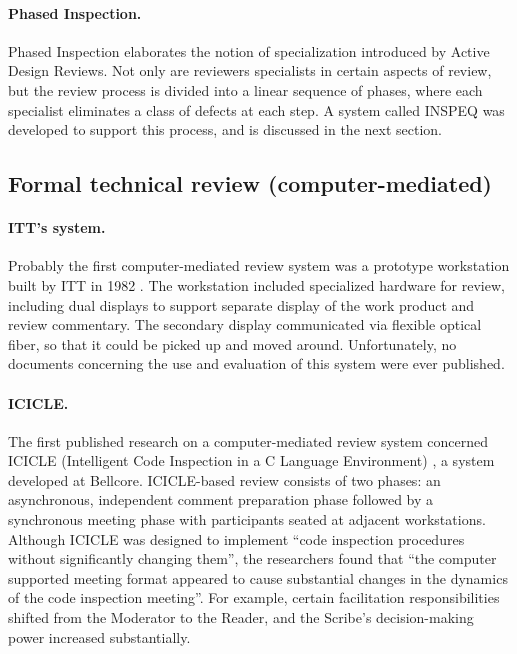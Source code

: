 \paragraph{Phased Inspection.}

Phased Inspection \cite{Knight93} elaborates the notion of specialization
introduced by Active Design Reviews.  Not only are reviewers specialists in
certain aspects of review, but the review process is divided into a linear
sequence of phases, where each specialist eliminates a class of defects at
each step.  A system called INSPEQ was developed to support this process,
and is discussed in the next section.


\subsection*{Formal technical review (computer-mediated)}


\paragraph{ITT's system.}
Probably the first computer-mediated review system was a prototype
workstation built by ITT in 1982 \cite{Jones95}. The workstation included
specialized hardware for review, including dual displays to support
separate display of the work product and review commentary.  The secondary
display communicated via flexible optical fiber, so that it could be picked
up and moved around.  Unfortunately, no documents concerning the use and
evaluation of this system were ever published.

\paragraph{ICICLE.}
The first published research on a computer-mediated review system
concerned ICICLE (Intelligent Code Inspection in a C Language Environment)
\cite{Brothers90}, a system developed at Bellcore.
ICICLE-based review consists of two phases: an asynchronous, independent
comment preparation phase followed by a synchronous meeting phase with
participants seated at adjacent workstations.  Although ICICLE was designed
to implement ``code inspection procedures without significantly changing
them'', the researchers found that ``the computer supported meeting format
appeared to cause substantial changes in the dynamics of the code
inspection meeting''.  For example, certain facilitation responsibilities
shifted from the Moderator to the Reader, and the Scribe's decision-making
power increased substantially.

